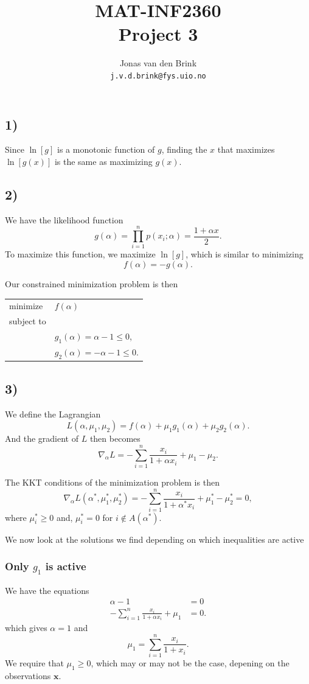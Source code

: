 \documentclass[a4paper, 11pt, notitlepage, english]{article}
\author{Jonas van den Brink \\ \texttt{j.v.d.brink@fys.uio.no}}
\title{MAT-INF2360 \\ Project 3}
\newcommand{\bt}[1]{\boldsymbol{#1}}
\begin{document}
\maketitle

\vspace{2cm}

\subsection*{1)}
Since $\ln[g]$ is a monotonic function of $g$, finding the $x$ that maximizes $\ln[g(x)]$ is the same as maximizing $g(x)$.

\subsection*{2)}
We have the likelihood function
$$g(\alpha) = \prod_{i=1}^n p(x_i;\alpha) = \frac{1+\alpha x}{2}.$$
To maximize this function, we maximize $\ln [g]$, which is similar to minimizing 
$$f(\alpha) = -g(\alpha).$$

Our constrained minimization problem is then

\begin{center}
\begin{tabular}{ll}
minimize & $f(\alpha)$ \\
subject to &  \\[-0.6cm]
& $g_1(\alpha) = \alpha - 1 \leq 0$, \\[-0.4cm]
& $g_2(\alpha) = -\alpha - 1 \leq 0$.
\end{tabular}
\end{center}

\clearpage

\subsection*{3)}
We define the Lagrangian
$$L(\alpha,\mu_1,\mu_2) = f(\alpha) + \mu_1 g_1(\alpha) + \mu_2 g_2(\alpha).$$
And the gradient of $L$ then becomes
$$\nabla_\alpha L = -\sum_{i=1}^n \frac{x_i}{1 + \alpha x_i} + \mu_1 - \mu_2.$$

The KKT conditions of the minimization problem is then 
$$\nabla_\alpha L(\alpha^*, \mu_1^*, \mu_2^*) = -\sum_{i=1}^n \frac{x_i}{1 + \alpha^* x_i} + \mu_1^* - \mu_2^* = 0,$$
where $\mu_i^* \geq 0$ and, $\mu_i^* = 0$ for $i\not\in A(\alpha^*)$.

We now look at the solutions we find depending on which inequalities are active
\subsubsection*{Only $g_1$ is active}
We have the equations
\begin{align*}
    \alpha - 1 &= 0 \\
    -\sum_{i=1}^n \frac{x_i}{1 + \alpha x_i} + \mu_1 &= 0.
\end{align*}
which gives $\alpha = 1$ and 
$$\mu_1 = \sum_{i=1}^n \frac{x_i}{1 + x_i}.$$
We require that $\mu_1 \geq 0$, which may or may not be the case, depening on the observations $\bt{x}$.
 
\end{document}
